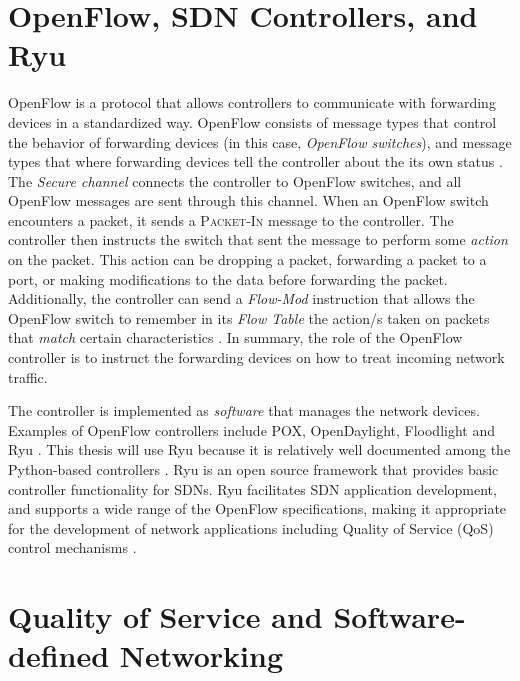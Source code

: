 \section{OpenFlow, SDN Controllers, and Ryu}
OpenFlow is a protocol that allows controllers to communicate with forwarding devices in a standardized way. OpenFlow consists of message types that control the behavior of forwarding devices (in this case, \textit{OpenFlow switches}), and message types that where forwarding devices tell the controller about the its own status \cite{open_networking_foundation_openflow_2009}. The \textit{Secure channel} connects the controller to OpenFlow switches, and all OpenFlow messages are sent through this channel. When an OpenFlow switch encounters a packet, it sends a \textsc{Packet-In} message to the controller. The controller then instructs the switch that sent the message to perform some \textit{action} on the packet. This action can be dropping a packet, forwarding a packet to a port, or making modifications to the data before forwarding the packet. Additionally, the controller can send a \textit{Flow-Mod} instruction that allows the OpenFlow switch to remember in its \textit{Flow Table} the action/s taken on packets that \textit{match} certain characteristics \cite{open_networking_foundation_openflow_2009}. In summary, the role of the OpenFlow controller is to instruct the forwarding devices on how to treat incoming network traffic.

The controller is implemented as \textit{software} that manages the network devices. Examples of OpenFlow controllers include  POX, OpenDaylight, Floodlight and Ryu \cite{salman_sdn_2016}. This thesis will use Ryu because it is relatively well documented among the Python-based controllers \cite{salman_sdn_2016}. Ryu is an open source framework that provides basic controller functionality for SDNs. Ryu facilitates SDN application development, and supports a wide range of the OpenFlow specifications, making it appropriate for the development of network applications including Quality of Service (QoS) control mechanisms \cite{kubo_ryu_2014}.

\section{Quality of Service and Software-defined Networking}

